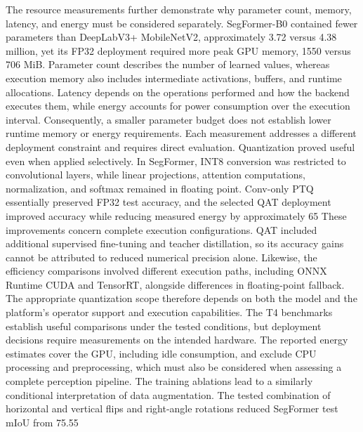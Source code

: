 The resource measurements further demonstrate why parameter count, memory, latency, and energy must be considered separately. SegFormer-B0 contained fewer parameters than DeepLabV3+ MobileNetV2, approximately 3.72 versus 4.38 million, yet its FP32 deployment required more peak GPU memory, 1550 versus 706 MiB. Parameter count describes the number of learned values, whereas execution memory also includes intermediate activations, buffers, and runtime allocations. Latency depends on the operations performed and how the backend executes them, while energy accounts for power consumption over the execution interval. Consequently, a smaller parameter budget does not establish lower runtime memory or energy requirements. Each measurement addresses a different deployment constraint and requires direct evaluation.
Quantization proved useful even when applied selectively. In SegFormer, INT8 conversion was restricted to convolutional layers, while linear projections, attention computations, normalization, and softmax remained in floating point. Conv-only PTQ essentially preserved FP32 test accuracy, and the selected QAT deployment improved accuracy while reducing measured energy by approximately 65%
These improvements concern complete execution configurations. QAT included additional supervised fine-tuning and teacher distillation, so its accuracy gains cannot be attributed to reduced numerical precision alone. Likewise, the efficiency comparisons involved different execution paths, including ONNX Runtime CUDA and TensorRT, alongside differences in floating-point fallback. The appropriate quantization scope therefore depends on both the model and the platform’s operator support and execution capabilities. The T4 benchmarks establish useful comparisons under the tested conditions, but deployment decisions require measurements on the intended hardware. The reported energy estimates cover the GPU, including idle consumption, and exclude CPU processing and preprocessing, which must also be considered when assessing a complete perception pipeline.
The training ablations lead to a similarly conditional interpretation of data augmentation. The tested combination of horizontal and vertical flips and right-angle rotations reduced SegFormer test mIoU from 75.55%
